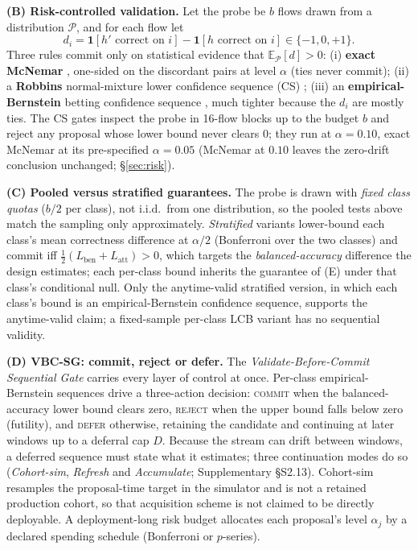 \documentclass[journal]{IEEEtran}
\begin{document}
\textbf{(B) Risk-controlled validation.} Let the probe be $b$ flows drawn from a distribution $\mathcal P$, and for each flow let
$$d_i = \mathbf 1[h'\text{ correct on }i] - \mathbf 1[h\text{ correct on }i]\in\{-1,0,+1\}.$$
Three rules commit only on statistical evidence that $\mathbb E_{\mathcal P}[d]>0$: (i) \textbf{exact McNemar} \cite{mcnemar1947note}, one-sided on the discordant pairs at level $\alpha$ (ties never commit); (ii) a \textbf{Robbins} normal-mixture lower confidence sequence (CS) \cite{howard2021timeuniform}; (iii) an \textbf{empirical-Bernstein} betting confidence sequence \cite{waudbysmith2023betting}, much tighter because the $d_i$ are mostly ties. The CS gates inspect the probe in 16-flow blocks up to the budget $b$ and reject any proposal whose lower bound never clears $0$; they run at $\alpha=0.10$, exact McNemar at its pre-specified $\alpha=0.05$ (McNemar at $0.10$ leaves the zero-drift conclusion unchanged; \S\ref{sec:risk}).

\textbf{(C) Pooled versus stratified guarantees.} The probe is drawn with \emph{fixed class quotas} ($b/2$ per class), not i.i.d.\ from one distribution, so the pooled tests above match the sampling only approximately. \emph{Stratified} variants lower-bound each class's mean correctness difference at $\alpha/2$ (Bonferroni over the two classes) and commit iff $\tfrac12(L_{\mathrm{ben}}+L_{\mathrm{att}})>0$, which targets the \emph{balanced-accuracy} difference the design estimates; each per-class bound inherits the guarantee of (E) under that class's conditional null. Only the anytime-valid stratified version, in which each class's bound is an empirical-Bernstein confidence sequence, supports the anytime-valid claim; a fixed-sample per-class LCB variant has no sequential validity.

\textbf{(D) VBC-SG: commit, reject or defer.} The \emph{Validate-Before-Commit Sequential Gate} carries every layer of control at once. Per-class empirical-Bernstein sequences drive a three-action decision: \textsc{commit} when the balanced-accuracy lower bound clears zero, \textsc{reject} when the upper bound falls below zero (futility), and \textsc{defer} otherwise, retaining the candidate and continuing at later windows up to a deferral cap $D$. Because the stream can drift between windows, a deferred sequence must state what it estimates; three continuation modes do so (\emph{Cohort-sim}, \emph{Refresh} and \emph{Accumulate}; Supplementary \S S2.13). Cohort-sim resamples the proposal-time target in the simulator and is not a retained production cohort, so that acquisition scheme is not claimed to be directly deployable. A deployment-long risk budget allocates each proposal's level $\alpha_j$ by a declared spending schedule (Bonferroni or $p$-series).
\end{document}
